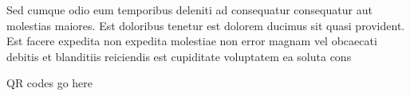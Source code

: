 \documentclass{article}%
\begin{document}
\newline%
    Sed cumque odio eum temporibus deleniti ad consequatur consequatur aut molestias maiores. Est doloribus tenetur est dolorem ducimus sit quasi provident. Est facere expedita non expedita molestiae non error magnam vel obcaecati debitis et blanditiis reiciendis est cupiditate voluptatem ea soluta cons%
\vspace*{140pt}%
\begin{center}%
\begin{Huge}%
QR codes go here%
\end{Huge}%
\end{center}%
\newpage%
\end{document}
